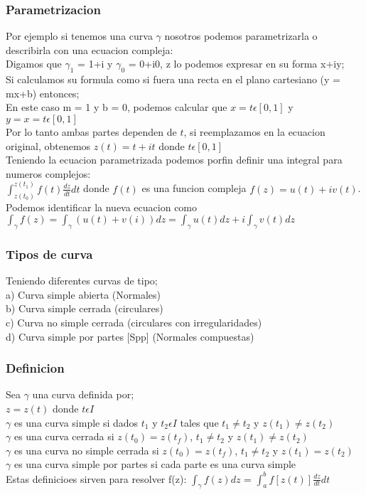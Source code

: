\documentclass{article}
\begin{document}
\subsubsection*{Parametrizacion}
Por ejemplo si tenemos una curva $\gamma$ nosotros podemos parametrizarla o describirla con una ecuacion compleja:
\\Digamos que $\gamma_1$ = 1+i y $\gamma_0$ = 0+i0, z lo podemos expresar en su forma x+iy;
\\Si calculamos su formula como si fuera una recta en el plano cartesiano (y = mx+b) entonces;
\\En este caso m = 1 y b = 0, podemos calcular que $x = t \epsilon [0,1]$ y $y = x = t \epsilon [0,1] $
\\Por lo tanto ambas partes dependen de $t$, si reemplazamos en la ecuacion original, obtenemos $z(t) = t+it$ donde $t \epsilon [0,1]$ 
\\Teniendo la ecuacion parametrizada podemos porfin definir una integral para numeros complejos:
\\$\int_{z(t_0)}^{z(t_1)} f(t) \frac{dz}{dt} dt$ donde $f(t)$ es una funcion compleja $f(z) = u(t) + iv(t)$.
\\Podemos identificar la nueva ecuacion como $\int_\gamma f(z) = \int_\gamma (u(t) + v(i))dz = \int_\gamma u(t)dz + i\int_\gamma v(t)dz$

\subsubsection*{Tipos de curva}
Teniendo diferentes curvas de tipo;
\\a) Curva simple abierta (Normales)
\\b) Curva simple cerrada (circulares)
\\c) Curva no simple cerrada (circulares con irregularidades)
\\d) Curva simple por partes [Spp] (Normales compuestas)

\subsubsection*{Definicion}
Sea $\gamma$ una curva definida por;
\\$z = z(t)$ donde $t \epsilon I$
\\$\gamma$ es una curva simple si dados $t_1$ y $t_2 \epsilon I$ tales que $t_1 \neq t_2$ y $z(t_1) \neq z(t_2)$
\\$\gamma$ es una curva cerrada si $z(t_0) = z(t_f)$, $t_1 \neq t_2$ y $z(t_1) \neq z(t_2)$
\\$\gamma$ es una curva no simple cerrada si $z(t_0) = z(t_f)$, $t_1 \neq t_2$ y $z(t_1) = z(t_2)$
\\$\gamma$ es una curva simple por partes si cada parte es una curva simple
\\Estas definicioes sirven para resolver f(z): $\int_\gamma f(z)dz$ = $\int_a^b f[z(t)]\frac{dz}{dt}dt$
\end{document}
